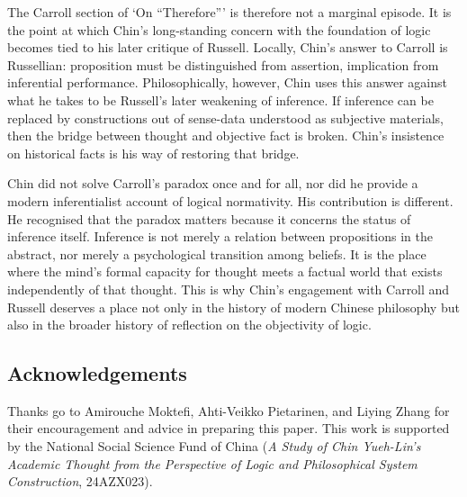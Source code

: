 \documentclass{birkjour}
\begin{document}
The Carroll section of `On ``Therefore''' is therefore not a marginal episode. It is the point at which Chin's long-standing concern with the foundation of logic becomes tied to his later critique of Russell. Locally, Chin's answer to Carroll is Russellian: proposition must be distinguished from assertion, implication from inferential performance. Philosophically, however, Chin uses this answer against what he takes to be Russell's later weakening of inference. If inference can be replaced by constructions out of sense-data understood as subjective materials, then the bridge between thought and objective fact is broken. Chin's insistence on historical facts is his way of restoring that bridge.

Chin did not solve Carroll's paradox once and for all, nor did he provide a modern inferentialist account of logical normativity. His contribution is different. He recognised that the paradox matters because it concerns the status of inference itself. Inference is not merely a relation between propositions in the abstract, nor merely a psychological transition among beliefs. It is the place where the mind's formal capacity for thought meets a factual world that exists independently of that thought. This is why Chin's engagement with Carroll and Russell deserves a place not only in the history of modern Chinese philosophy but also in the broader history of reflection on the objectivity of logic.

\subsection*{Acknowledgements}

Thanks go to Amirouche Moktefi, Ahti-Veikko Pietarinen, and Liying Zhang for their encouragement and advice in preparing this paper. This work is supported by the National Social Science Fund of China (\textit{A Study of Chin Yueh-Lin's Academic Thought from the Perspective of Logic and Philosophical System Construction}, 24AZX023).



\end{document}
